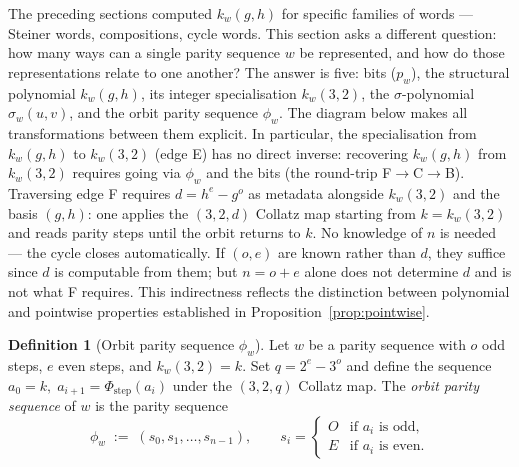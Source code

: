 \documentclass[12pt]{article}
\theoremstyle{definition}
\newtheorem{definition}[theorem]{Definition}
\theoremstyle{remark}
\newcommand{\kpoly}{k}
\begin{document}
The preceding sections computed $\kpoly_w(g,h)$ for specific families of
words — Steiner words, compositions, cycle words.  This section asks a
different question: how many ways can a single parity sequence $w$ be
represented, and how do those representations relate to one another?  The
answer is five: bits ($p_w$), the structural polynomial $\kpoly_w(g,h)$,
its integer specialisation $\kpoly_w(3,2)$, the $\sigma$-polynomial
$\sigma_w(u,v)$, and the orbit parity sequence $\phi_w$.  The diagram below
makes all transformations between them explicit.  In particular, the
specialisation from $\kpoly_w(g,h)$ to $\kpoly_w(3,2)$ (edge E) has no
direct inverse: recovering $\kpoly_w(g,h)$ from $\kpoly_w(3,2)$ requires
going via $\phi_w$ and the bits (the round-trip F$\to$C$\to$B).
Traversing edge F requires $d = h^e - g^o$ as metadata alongside
$\kpoly_w(3,2)$ and the basis $(g,h)$: one applies the $(3,2,d)$ Collatz
map starting from $k = \kpoly_w(3,2)$ and reads parity steps until the
orbit returns to $k$.  No knowledge of $n$ is needed — the cycle closes
automatically.  If $(o,e)$ are known rather than $d$, they suffice since
$d$ is computable from them; but $n = o + e$ alone does not determine $d$
and is not what F requires.
This indirectness reflects the distinction between polynomial and pointwise
properties established in Proposition~\ref{prop:pointwise}.

\begin{definition}[Orbit parity sequence $\phi_w$]
\label{def:phi}
Let $w$ be a parity sequence with $o$ odd steps, $e$ even steps, and
$\kpoly_w(3,2) = k$.  Set $q = 2^e - 3^o$ and define the sequence
$a_0 = k,\; a_{i+1} = \Phi_{\text{step}}(a_i)$ under the $(3,2,q)$ Collatz
map.  The \emph{orbit parity sequence} of $w$ is the parity sequence
\[
  \phi_w \;:=\; (s_0, s_1, \ldots, s_{n-1}), \qquad
  s_i = \begin{cases} O & \text{if } a_i \text{ is odd}, \\ E & \text{if } a_i \text{ is even}. \end{cases}
\]
\end{definition}
\end{document}

